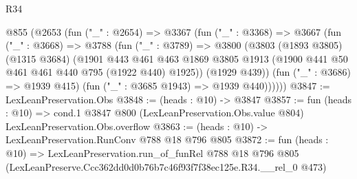 \begin{lexlean}{R34}
\begin{coremodule}
  @855
    (@2653
      (fun ("_" : @2654) =>
      @3367
        (fun ("_" : @3368) =>
        @3667
          (fun ("_" : @3668) =>
          @3788
            (fun ("_" : @3789) =>
            @3800
              (@3803
                (@1893 @3805)
                (@1315 @3684)
                (@1901
                  @443
                  @461
                  @463
                  @1869
                  @3805
                  @1913
                  (@1900 @441 @50 @461 @461 @440 @795 (@1922 @440) @1925))
                (@1929 @439))
              (fun ("_" : @3686) => @1939 @415)
              (fun ("_" : @3685 @1943) => @1939 @440))))))
@3847 := LexLeanPreservation.Obs
@3848 := (heads : @10) -> @3847
@3857 := fun (heads : @10) =>
  cond.{1} @3847 @800 (LexLeanPreservation.Obs.value @804) LexLeanPreservation.Obs.overflow
@3863 := (heads : @10) -> LexLeanPreservation.RunConv @788 @18 @796 @805
@3872 := fun (heads : @10) =>
  LexLeanPreservation.run_of_funRel
    @788
    @18
    @796
    @805
    (LexLeanPreserve.Ccc362dd0d0b76b7c46f93f7f38ec125e.R34.__rel_0 @473)
\end{coremodule}
\end{lexlean}
